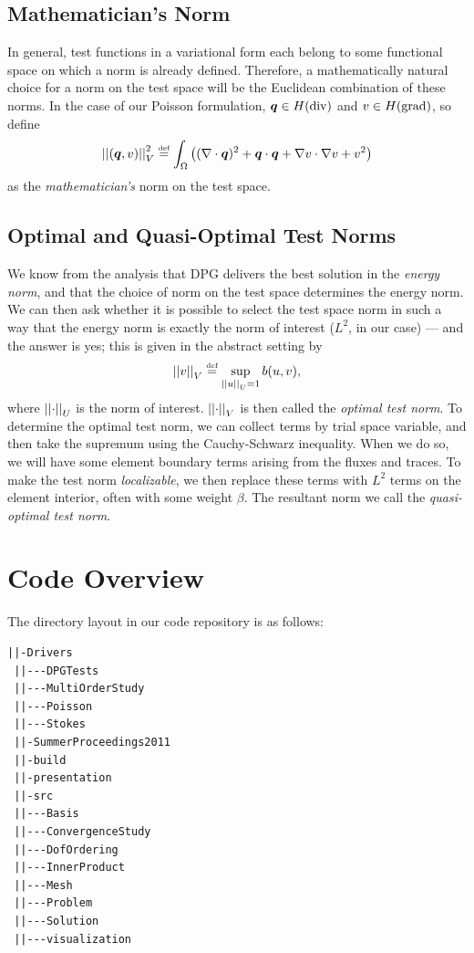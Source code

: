 \subsection{Mathematician's Norm}
In general, test functions in a variational form each belong to some functional space on which a norm is already defined.  Therefore, a mathematically natural choice for a norm on the test space will be the Euclidean combination of these norms.  In the case of our Poisson formulation, $\vect{q} \in \NVRHdiv$ and $v \in \NVRHgrad$, so define
\begin{align*}
\norm{(\vect{q},v)}_{V}^{2}  \NVReqdef \int_{\Omega} &\left((\NVRdiv \vect{q})^{2} + \vect{q} \cdot \vect{q} + \NVRgrad v \cdot \NVRgrad v + v^{2}\right)\\
\end{align*}
as the \emph{mathematician's} norm on the test space.

\subsection{Optimal and Quasi-Optimal Test Norms}
We know from the analysis that DPG delivers the best solution in the \emph{energy norm}, and that the choice of norm on the test space determines the energy norm.  We can then ask whether it is possible to select the test space norm in such a way that the energy norm is exactly the norm of interest ($L^{2}$, in our case) --- and the answer is yes; this is given in the abstract setting by 
\begin{align*}
\norm{v}_{V}\NVReqdef \sup_{\norm{u}_{U}=1} b(u,v),
\end{align*}
where $\norm{\cdot}_{U}$ is the norm of interest.  $\norm{\cdot}_{V}$ is then called the \emph{optimal test norm}.  To determine the optimal test norm, we can collect terms by trial space variable, and then take the supremum using the Cauchy-Schwarz inequality.  When we do so, we will have some element boundary terms arising from the fluxes and traces.  To make the test norm \emph{localizable}, we then replace these terms with $L^{2}$ terms on the element interior, often with some weight $\beta$.  The resultant norm we call the \emph{quasi-optimal test norm}.

\section{Code Overview}\label{NVR:sec:codeOverview}
The directory layout in our code repository is as follows:
\begin{center}
\begin{minipage}{0.4\textwidth}
{\bf
\begin{lstlisting}[backgroundcolor=\color{lightlightgreen}]
 ||-Drivers
 ||---DPGTests
 ||---MultiOrderStudy
 ||---Poisson
 ||---Stokes
 ||-SummerProceedings2011
 ||-build
 ||-presentation
 ||-src
 ||---Basis
 ||---ConvergenceStudy
 ||---DofOrdering
 ||---InnerProduct
 ||---Mesh
 ||---Problem
 ||---Solution
 ||---visualization
\end{lstlisting}
}
\end{minipage}
\end{center}

